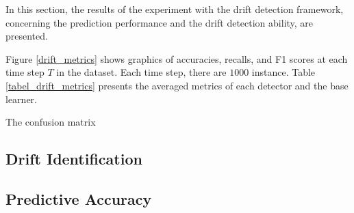 In this section, the results of the experiment with the drift detection framework, concerning the prediction performance and the drift detection ability, are presented.

Figure \ref{drift_metrics} shows graphics of accuracies, recalls, and F1 scores at each time step $T$ in the dataset. Each time step, there are $1000$ instance. Table \ref{tabel_drift_metrics} presents the averaged metrics of each detector and the base learner.

The confusion matrix


\subsection{Drift Identification}
\subsection{Predictive Accuracy}